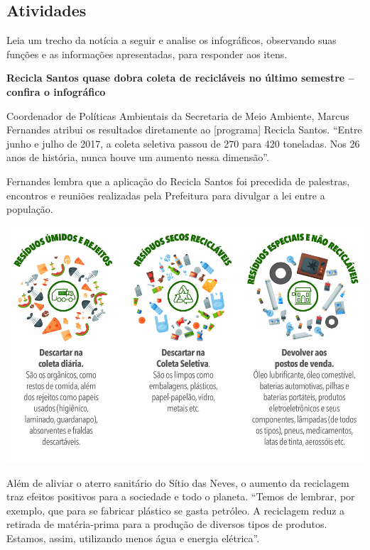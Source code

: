 \begin{conteudo}
\begin{conteudo}
\begin{conteudo}
\begin{conteudo}
\begin{conteudo}
\section*{Atividades}


Leia um trecho da notícia a seguir e analise os infográficos,
observando suas funções e as informações apresentadas, para responder aos itens.

\begin{myquote}
\textbf{Recicla Santos quase dobra coleta de recicláveis no último
semestre -- confira o infográfico}


Coordenador de Políticas Ambientais da Secretaria de Meio Ambiente,
Marcus Fernandes atribui os resultados diretamente ao [programa] Recicla Santos.
``Entre junho e julho de 2017, a coleta seletiva passou de 270 para 420
toneladas. Nos 26 anos de história, nunca houve um aumento nessa
dimensão''.

Fernandes lembra que a aplicação do Recicla Santos foi precedida de
palestras, encontros e reuniões realizadas pela Prefeitura para divulgar
a lei entre a população.

\begin{center}
\includegraphics[width=\textwidth]{media/image30.jpeg}
\end{center}

Além de aliviar o aterro sanitário do Sítio das Neves, o aumento da
reciclagem traz efeitos positivos para a sociedade e todo o planeta.
``Temos de lembrar, por exemplo, que para se fabricar plástico se gasta
petróleo. A reciclagem reduz a retirada de matéria-prima para a produção
de diversos tipos de produtos. Estamos, assim, utilizando menos água e
energia elétrica''.


\end{myquote}
\end{conteudo}
\end{conteudo}
\end{conteudo}
\end{conteudo}
\end{conteudo}
